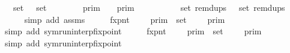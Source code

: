 \begin{isabellebody}
\ \ \ {\isacartoucheopen}set\ {\isasymGamma}\ {\isacharequal}\ set\ {\isasymGamma}{\isacharprime}{\isacartoucheclose}\isanewline
\ \ \ \ \ {\isacartoucheopen}{\isasymlbrakk}{\isasymlbrakk}\ {\isasymGamma}\ {\isasymrbrakk}{\isasymrbrakk}\isactrlsub p\isactrlsub r\isactrlsub i\isactrlsub m\ {\isacharequal}\ {\isasymlbrakk}{\isasymlbrakk}\ {\isasymGamma}{\isacharprime}\ {\isasymrbrakk}{\isasymrbrakk}\isactrlsub p\isactrlsub r\isactrlsub i\isactrlsub m{\isacartoucheclose}\isanewline
%
\isadelimproof
%
\endisadelimproof
%
\isatagproof
{}\isamarkupfalse%
\ {\isacharminus}\ \ \ \ \ \isanewline
\ \ \isamarkupfalse%
\ {\isacartoucheopen}set\ {\isacharparenleft}remdups\ {\isasymGamma}{\isacharparenright}\ {\isacharequal}\ set\ {\isacharparenleft}remdups\ {\isasymGamma}{\isacharprime}{\isacharparenright}{\isacartoucheclose}\isanewline
\ \ \ \ \isamarkupfalse%
\ {\isacharparenleft}simp\ add{\isacharcolon}\ assms{\isacharparenright}\isanewline
\ \ \isamarkupfalse%
\ \isamarkupfalse%
\ fxpnt{\isasymGamma}{\isacharcolon}\ {\isacartoucheopen}{\isasymInter}\ {\isacharparenleft}{\isacharparenleft}{\isasymlambda}{\isasymgamma}{\isachardot}\ {\isasymlbrakk}\ {\isasymgamma}\ {\isasymrbrakk}\isactrlsub p\isactrlsub r\isactrlsub i\isactrlsub m{\isacharparenright}\ {\isacharbackquote}\ set\ {\isasymGamma}{\isacharparenright}\ {\isacharequal}\ {\isasymlbrakk}{\isasymlbrakk}\ {\isasymGamma}\ {\isasymrbrakk}{\isasymrbrakk}\isactrlsub p\isactrlsub r\isactrlsub i\isactrlsub m{\isacartoucheclose}\isanewline
\ \ \ \ \isamarkupfalse%
\ {\isacharparenleft}simp\ add{\isacharcolon}\ symrun{\isacharunderscore}interp{\isacharunderscore}fixpoint{\isacharparenright}\isanewline
\ \ \isamarkupfalse%
\ \isamarkupfalse%
\ fxpnt{\isasymGamma}{\isacharprime}{\isacharcolon}\ {\isacartoucheopen}{\isasymInter}\ {\isacharparenleft}{\isacharparenleft}{\isasymlambda}{\isasymgamma}{\isachardot}\ {\isasymlbrakk}\ {\isasymgamma}\ {\isasymrbrakk}\isactrlsub p\isactrlsub r\isactrlsub i\isactrlsub m{\isacharparenright}\ {\isacharbackquote}\ set\ {\isasymGamma}{\isacharprime}{\isacharparenright}\ {\isacharequal}\ {\isasymlbrakk}{\isasymlbrakk}\ {\isasymGamma}{\isacharprime}\ {\isasymrbrakk}{\isasymrbrakk}\isactrlsub p\isactrlsub r\isactrlsub i\isactrlsub m{\isacartoucheclose}\isanewline
\ \ \ \ \isamarkupfalse%
\ {\isacharparenleft}simp\ add{\isacharcolon}\ symrun{\isacharunderscore}interp{\isacharunderscore}fixpoint{\isacharparenright}\isanewline

\end{isabellebody}
